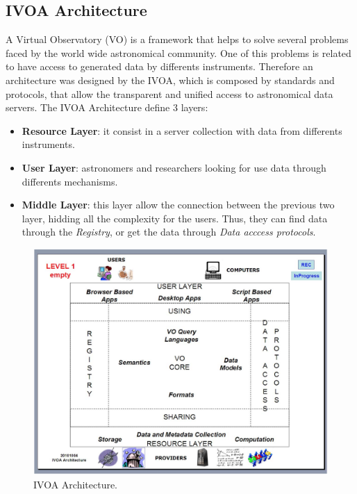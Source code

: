 
\subsection{IVOA Architecture}

A Virtual Observatory (VO) is a framework that helps to solve several
problems faced by the world wide astronomical community.
One of this problems is related to have access to generated data by
differents instruments. Therefore an architecture
\cite{ivoaarchitecture} was designed by the IVOA, which is composed by
standards and protocols, that allow the transparent
and unified access to astronomical data servers. The IVOA Architecture
define 3 layers:
\begin{itemize}
        \item \textbf{Resource Layer}: it consist in a server
collection with data from differents instruments.
        \item \textbf{User Layer}: astronomers and researchers looking
for use data through differents mechanisms.
        \item \textbf{Middle Layer}: this layer allow the connection
between the previous two layer, hidding all the complexity for the
users. Thus, they can find data through the \emph{Registry}, or get the data
through \emph{Data acccess protocols}.
\end{itemize}

\begin{figure}%
\begin{center}
	\includegraphics[width=0.9\linewidth]{img/ivoa_arch.png}
	\caption{IVOA Architecture.}
\end{center}
\label{figure:ivoarch}
\end{figure}


